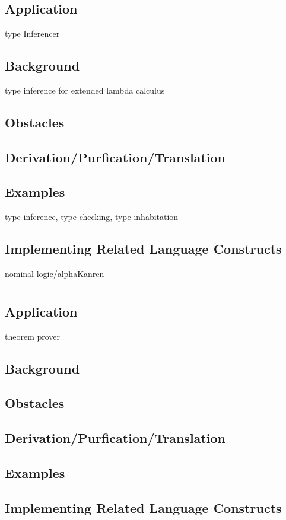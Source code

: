 \chapter{}
\section{Application}
type Inferencer
\section{Background}
type inference for extended lambda calculus 
\section{Obstacles}
\section{Derivation/Purfication/Translation}
\section{Examples}
type inference, type checking, type inhabitation
\section{Implementing Related Language Constructs}
nominal logic/alphaKanren

\chapter{}
\section{Application}
theorem prover
\section{Background}
\section{Obstacles}
\section{Derivation/Purfication/Translation}
\section{Examples}
\section{Implementing Related Language Constructs}

